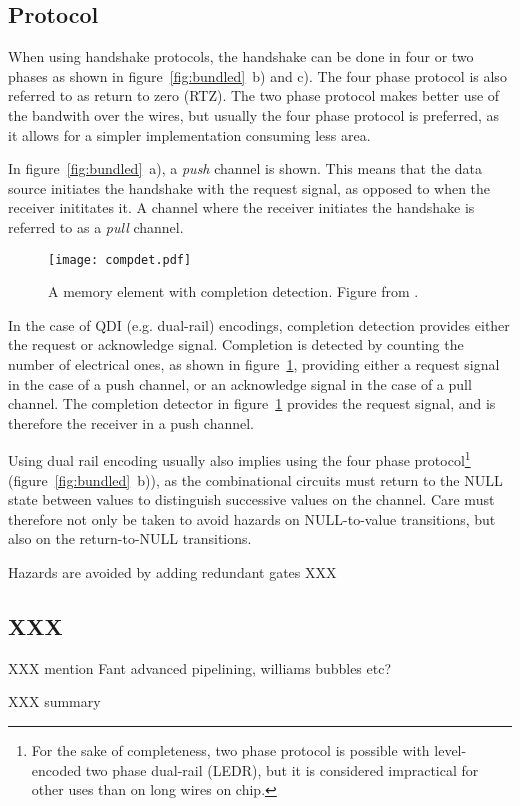 \subsection{Protocol}

When using handshake protocols, the handshake can be done in four or
two phases as shown in figure~\ref{fig:bundled}~b) and c). The four
phase protocol is also referred to as return to zero (RTZ). The two
phase protocol makes better use of the bandwith over the wires, but
usually the four phase protocol is preferred, as it allows for a
simpler implementation consuming less area.

In figure~\ref{fig:bundled}~a), a \emph{push} channel is shown. This
means that the data source initiates the handshake with the request
signal, as opposed to when the receiver inititates it. A channel where
the receiver initiates the handshake is referred to as a \emph{pull}
channel.

\begin{figure}[htbp]
  \centering
  \texttt{[image: compdet.pdf]}
  \caption{A memory element with completion detection. Figure from
    \cite[pp. 21]{sparso}.}
  \label{fig:compdet}
\end{figure}

In the case of QDI (e.g. dual-rail) encodings, completion detection
provides either the request or acknowledge signal. Completion is
detected by counting the number of electrical ones, as shown in
figure~\ref{fig:compdet}, providing either a request signal in the
case of a push channel, or an acknowledge signal in the case of a pull
channel. The completion detector in figure~\ref{fig:compdet} provides
the request signal, and is therefore the receiver in a push channel.

Using dual rail encoding usually also implies using the four phase
protocol\footnote{For the sake of completeness, two phase protocol is
  possible with level-encoded two phase dual-rail (LEDR)\cite{ledr},
  but it is considered impractical for other uses than on long wires
  on chip.}  (figure~\ref{fig:bundled}~b)), as the combinational
circuits must return to the NULL state between values to distinguish
successive values on the channel. Care must therefore not only be
taken to avoid hazards on NULL-to-value transitions, but also on the
return-to-NULL transitions.

Hazards are avoided by adding redundant gates XXX

\subsection{XXX}

XXX mention Fant advanced pipelining, williams bubbles etc?

XXX summary

